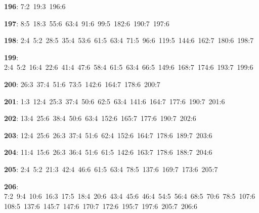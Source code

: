 \noindent \textbf{196}: 7:2\allowbreak\ 19:3\allowbreak\ 196:6\par
\noindent \textbf{197}: 8:5\allowbreak\ 18:3\allowbreak\ 55:6\allowbreak\ 63:4\allowbreak\ 91:6\allowbreak\ 99:5\allowbreak\ 182:6\allowbreak\ 190:7\allowbreak\ 197:6\par
\noindent \textbf{198}: 2:4\allowbreak\ 5:2\allowbreak\ 28:5\allowbreak\ 35:4\allowbreak\ 53:6\allowbreak\ 61:5\allowbreak\ 63:4\allowbreak\ 71:5\allowbreak\ 96:6\allowbreak\ 119:5\allowbreak\ 144:6\allowbreak\ 162:7\allowbreak\ 180:6\allowbreak\ 198:7\par
\noindent \textbf{199}: 2:4\allowbreak\ 5:2\allowbreak\ 16:4\allowbreak\ 22:6\allowbreak\ 41:4\allowbreak\ 47:6\allowbreak\ 58:4\allowbreak\ 61:5\allowbreak\ 63:4\allowbreak\ 66:5\allowbreak\ 149:6\allowbreak\ 168:7\allowbreak\ 174:6\allowbreak\ 193:7\allowbreak\ 199:6\par
\noindent \textbf{200}: 26:3\allowbreak\ 37:4\allowbreak\ 51:6\allowbreak\ 73:5\allowbreak\ 142:6\allowbreak\ 164:7\allowbreak\ 178:6\allowbreak\ 200:7\par
\noindent \textbf{201}: 1:3\allowbreak\ 12:4\allowbreak\ 25:3\allowbreak\ 37:4\allowbreak\ 50:6\allowbreak\ 62:5\allowbreak\ 63:4\allowbreak\ 141:6\allowbreak\ 164:7\allowbreak\ 177:6\allowbreak\ 190:7\allowbreak\ 201:6\par
\noindent \textbf{202}: 13:4\allowbreak\ 25:6\allowbreak\ 38:4\allowbreak\ 50:6\allowbreak\ 63:4\allowbreak\ 152:6\allowbreak\ 165:7\allowbreak\ 177:6\allowbreak\ 190:7\allowbreak\ 202:6\par
\noindent \textbf{203}: 12:4\allowbreak\ 25:6\allowbreak\ 26:3\allowbreak\ 37:4\allowbreak\ 51:6\allowbreak\ 62:4\allowbreak\ 152:6\allowbreak\ 164:7\allowbreak\ 178:6\allowbreak\ 189:7\allowbreak\ 203:6\par
\noindent \textbf{204}: 11:4\allowbreak\ 15:6\allowbreak\ 26:3\allowbreak\ 36:4\allowbreak\ 51:6\allowbreak\ 61:5\allowbreak\ 142:6\allowbreak\ 163:7\allowbreak\ 178:6\allowbreak\ 188:7\allowbreak\ 204:6\par
\noindent \textbf{205}: 2:4\allowbreak\ 5:2\allowbreak\ 21:3\allowbreak\ 42:4\allowbreak\ 46:6\allowbreak\ 61:5\allowbreak\ 63:4\allowbreak\ 78:5\allowbreak\ 137:6\allowbreak\ 169:7\allowbreak\ 173:6\allowbreak\ 205:7\par
\noindent \textbf{206}: 7:2\allowbreak\ 9:4\allowbreak\ 10:6\allowbreak\ 16:3\allowbreak\ 17:5\allowbreak\ 18:4\allowbreak\ 20:6\allowbreak\ 43:4\allowbreak\ 45:6\allowbreak\ 46:4\allowbreak\ 54:5\allowbreak\ 56:4\allowbreak\ 68:5\allowbreak\ 70:6\allowbreak\ 78:5\allowbreak\ 107:6\allowbreak\ 108:5\allowbreak\ 137:6\allowbreak\ 145:7\allowbreak\ 147:6\allowbreak\ 170:7\allowbreak\ 172:6\allowbreak\ 195:7\allowbreak\ 197:6\allowbreak\ 205:7\allowbreak\ 206:6\par
